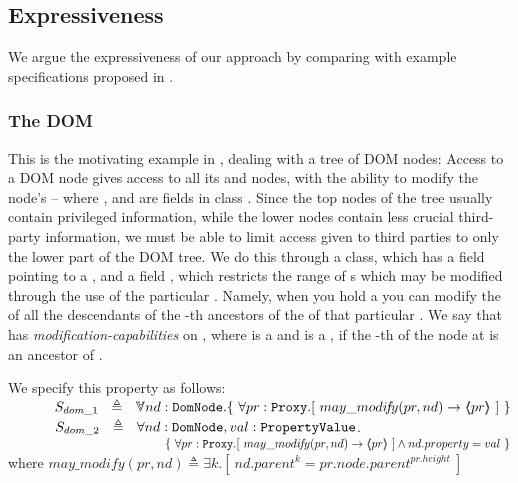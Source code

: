 \subsection{Expressiveness} 

\label{app:expressivity}

We argue the expressiveness of our approach by comparing with example specifications  proposed in \cite{OOPSLA22,dd,irisWasm23}.

 

\subsubsection{The DOM}  %
\label{ss:DOM}
This is the motivating example in \cite{dd},
dealing with a tree of DOM nodes: Access to a DOM node
gives access to all its  and  nodes, with the ability to
modify the node's  -- where  ,  and 
are fields in class . Since the top nodes of the tree
usually contain privileged information, while the lower nodes contain
less crucial third-party information, we must be able to limit 
 access given to third parties to only the lower part of the DOM tree. We do this through a  class, which has a field  pointing to a , and a field , which restricts the range of s which may be modified through the use of the particular . Namely, when you hold a   you can modify the  of all the descendants of the    -th ancestors of the  of that particular .  We say that
 has \emph{modification-capabilities} on , where  is
a   and  is a , if the -th  
of the node at  is an ancestor of .

We specify this property as follows:
\\
$\strut \SPSP  S_{dom\_1}\ \  \triangleq \ \ \TwoStatesN{ nd:\prg{DomNode}}{\  \forall pr:\prg{Proxy}.[ \ may\_modi\!f\!y(pr, nd) \rightarrow \inside{pr}\  ] \ }$ 
\\
$\strut \SPSP  S_{dom\_2}\ \  \triangleq \ \  \forall{ nd:\prg{DomNode}, val:\prg{PropertyValue} }$.\\
$\strut \SPSP\strut \SPSP\strut \SPSP\strut \SPSP	\{ { \ \forall pr:\prg{Proxy}.[ \ may\_modi\!f\!y(pr, nd) \rightarrow \inside{pr}\  ]  \wedge nd.property = val} \ \} $ 
\\
where $may\_modi\!f\!y(pr, nd) \triangleq \exists k. [ \  nd.parent^k=pr.node.parent^{pr.height}\ ]$



